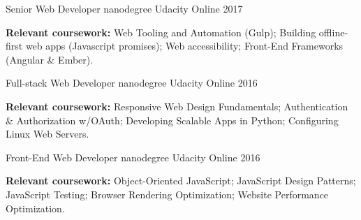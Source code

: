 \clearpage



\begin{cventries}


\cventry
{Senior Web Developer nanodegree} %
{Udacity} %
{Online} %
{2017} %
{ %
	\begin{cvitems}
		\textbf{Relevant coursework:} \newline
		Web Tooling and Automation (Gulp); Building offline-first web apps (Javascript promises); Web accessibility; Front-End Frameworks (Angular \& Ember).
	\end{cvitems}
}


\cventry
{Full-stack Web Developer nanodegree} %
{Udacity} %
{Online} %
{2016} %
{ %
	\begin{cvitems}
		\textbf{Relevant coursework:} \newline
		Responsive Web Design Fundamentals; Authentication \& Authorization w/OAuth; Developing Scalable Apps in Python; Configuring Linux Web Servers.
	\end{cvitems}
}


\cventry
{Front-End Web Developer nanodegree} %
{Udacity} %
{Online} %
{2016} %
{ %
\begin{cvitems}
	\textbf{Relevant coursework:} \newline
	Object-Oriented JavaScript; JavaScript Design Patterns; JavaScript Testing; Browser Rendering Optimization; Website Performance Optimization.
\end{cvitems}
}


\end{cventries}